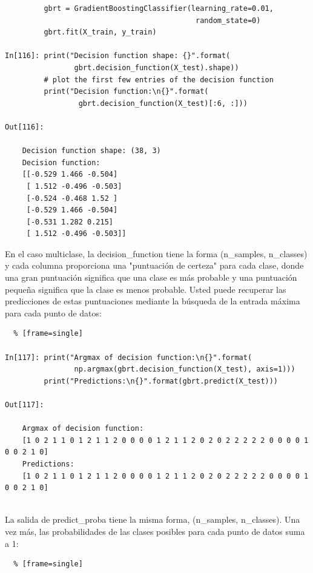 {\begin{lstlisting}
         gbrt = GradientBoostingClassifier(learning_rate=0.01,
                                            random_state=0)
         gbrt.fit(X_train, y_train)
   
In[116]: print("Decision function shape: {}".format(
                gbrt.decision_function(X_test).shape))
         # plot the first few entries of the decision function
         print("Decision function:\n{}".format(
                 gbrt.decision_function(X_test)[:6, :]))
 
Out[116]:
    
    Decision function shape: (38, 3)
    Decision function:
    [[-0.529 1.466 -0.504]
     [ 1.512 -0.496 -0.503]
     [-0.524 -0.468 1.52 ]
     [-0.529 1.466 -0.504]
     [-0.531 1.282 0.215]
     [ 1.512 -0.496 -0.503]]

\end{lstlisting} 


En el caso multiclase, la {\ttfamily decision\_function}  tiene la forma {\ttfamily  (n\_samples, n\_classes)} y cada columna proporciona una "{}puntuación de certeza"{ }  para cada clase, donde una gran puntuación  significa que una clase es más probable y una puntuación pequeña significa que la clase es menos probable. Usted puede recuperar las predicciones de estas puntuaciones mediante la búsqueda de la entrada máxima para cada punto de datos:\\


\begin{lstlisting}  % [frame=single]	

In[117]: print("Argmax of decision function:\n{}".format(
                np.argmax(gbrt.decision_function(X_test), axis=1)))
         print("Predictions:\n{}".format(gbrt.predict(X_test)))

Out[117]:
   
    Argmax of decision function:
    [1 0 2 1 1 0 1 2 1 1 2 0 0 0 0 1 2 1 1 2 0 2 0 2 2 2 2 2 0 0 0 0 1 0 0 2 1 0]
    Predictions:
    [1 0 2 1 1 0 1 2 1 1 2 0 0 0 0 1 2 1 1 2 0 2 0 2 2 2 2 2 0 0 0 0 1 0 0 2 1 0]


\end{lstlisting} 


La salida de {\ttfamily predict\_proba} tiene la misma forma, {\ttfamily(n\_samples, n\_classes)}. Una vez más, las probabilidades de las clases posibles para cada punto de datos suma a 1:



\begin{lstlisting}  % [frame=single]	


\end{lstlisting}}
